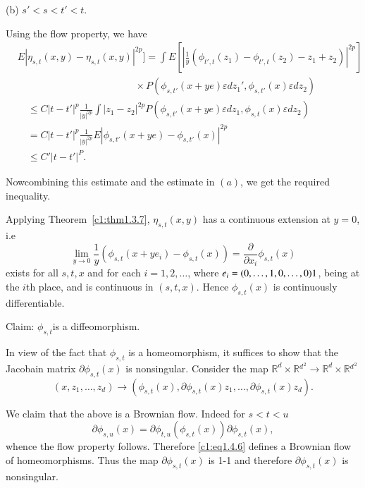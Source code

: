 (b) $s' < s < t' < t$.

Using the flow property, we have
\begin{align*}
  & E| \eta_{s,t}(x,y)- \eta_{s,t}(x,y)|^{2p} ]
    =\int E \left[|  \frac{1}{y}( \phi_{t',t}(z_1)- \phi_{t',t}(z_2) - z_1+z_2)
      |^{2p}\right]\\
    & \hspace{5cm} \times  P(\phi_{s,t'} (x+ye) \varepsilon dz_1',  \phi_{s,t'}
    (x) \varepsilon dz_2)\\ 
    &\quad  \le C|t-t'|^p \frac{1}{|y|^{2p}} \int |z_1- z_2| ^{2p}
    P(\phi_{s,t'} (x+ye)  \varepsilon dz_1, \phi_{s, t} (x)
    \varepsilon dz_2)\\ 
    & \quad = C|t-t'|^p \frac{1}{|y|^{2p}} E| \phi_{s,t'} (x + ye) -
    \phi_{s,t'} (x)|^{2p}\\ 
    &\quad  \le C'|t-t'|^P.
\end{align*}

Now\pageoriginale combining this estimate and the estimate in $(a)$, we get the
required inequality. 

\begin{proofoftheorem}\label{c1:prfthm1.4.1}%
  Applying Theorem~\ref{c1:thm1.3.7}, $\eta_{s,t}(x,y)$ has a continuous 
  extension at $y=0$, i.e 
  $$
  \lim_{y\to 0} \frac{1}{y} (\phi_{s,t}{{(x + ye_i)}} - \phi_{s,t}{{(x)}}) 
  = \frac{\partial}{\partial x_i} \phi_{s,t}{{(x)}} 
  $$ 
  exists for all $s,t,x$ and for each $i=1,2, \ldots$, where
  $e_i=(0,\ldots,1,0,\ldots,\break 0) 1$, being at the $i$th place, and is
  continuous in $(s,t,x)$. Hence $\phi_{s,t}{{(x)}}$ is continuously
  differentiable.  
\end{proofoftheorem}

Claim: $\phi_{s,t}$is a diffeomorphism.

In view of the fact that $\phi_{s,t}$ is a homeomorphism, it suffices
to show that the Jacobain matrix $\partial\phi_{s,t}{{(x)}}$ is
nonsingular. Consider the map $\mathbb{R}^d \times
\mathbb{R}{^d{^{^2}}} \to \mathbb{R}^d \times \mathbb{R}{^d{^{^2}}}$ 
\begin{equation*} 
  (x,z_1, \ldots,z_d) \to (\phi_{s,t}(x),
  \partial\phi_{s,t}(x) z_1, \ldots, \partial\phi_{s,t}(x)
  z_d). \tag{1.4.6}\label{c1:eq1.4.6}  
\end{equation*}

We claim that the above is a Brownian flow. Indeed for $s < t < u$
$$
\partial\phi_{s,u}(x) = \partial\phi_{t,u} (\phi_{s,t}(x)) 
\partial\phi_{s,t}(x), 
$$
whence the flow property follows. Therefore \eqref{c1:eq1.4.6} defines a
Brownian flow of homeomorphisms. Thus the map
$\partial\phi_{s,t}{{(x)}}$ is 1-1 and therefore
$\partial\phi_{s,t}{{(x)}}$ is nonsingular. 



